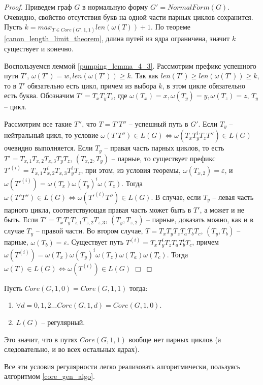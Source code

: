 \begin{proof}
    Приведем граф $G$ в нормальную форму $G' = NormalForm(G)$. 
    Очевидно, свойство отсутствия букв на одной части парных циклов сохранится.
    Пусть $k = max_{T \in Core(G',1,1)} len(\omega(T)) + 1$. 
    По теореме \ref{canon_length_limit_theorem}, длина путей из ядра ограничена, значит $k$ существует и конечно.

    Воспользуемся леммой \ref{pumping_lemma_4_3}.
    Рассмотрим префикс успешного пути $T'$, $\omega(T') = w, len(\omega(T')) \geq k$. 
    Так как $len(T') \geq len(\omega(T')) \geq k$, то в $T'$ обязательно есть цикл, 
    причем из выбора $k$, в этом цикле обязательно есть буква.
    Обозначим $T' = T_x T_y T_z$, где $\omega(T_x) = x, \omega(T_y) = y, \omega(T_z) = z$, $T_y$ -- цикл.
    
    Рассмотрим все такие $T''$, что $T = T' T''$ -- успешный путь в $G'$.
    Если $T_y$ -- нейтральный цикл, то условие $\omega(T' T'') \in L(G) \iff \omega(T_x T_y^i T_z T'') \in L(G)$ очевидно выполняется.
    Если $T_y$ -- правая часть парных циклов, то есть $T' = T_{x,1} T_{x,2} T_{x,3} T_y T_z$, $(T_{x,2}, T_y)$ -- парные,
    то существует префикс $T'^{(i)} = T_{x,1} T_{x,2}^i T_{x,3} T_y^i T_z$, при этом, из условия теоремы, $\omega(T_{x,2}) = \varepsilon$,
    и $\omega(T'^{(i)}) = \omega(T_x) \omega(T_y)^i \omega(T_z)$. Тогда $\omega(T' T'') \in L(G) \iff \omega(T'^{(i)} T'') \in L(G)$.
    В случае, если $T_y$ -- левая часть парного цикла, соответствующая правая часть может быть в $T'$, а может и не быть. 
    Если $T' = T_x T_y T_{z,1} T_{z,2} T_{z,3}$, $(T_y,T_{z,2})$ -- парные, доказать можно, как и в случае $T_y$ -- правой части.
    Во втором случае, $T = T_x T_y T_z T_a T_b T_c$, $(T_y,T_b)$ -- парные,
    $\omega(T_b) = \varepsilon$. Существует путь $T^{(i)} = T_x T_y^i T_z T_a T_b^i T_c$, 
    причем $\omega(T^{(i)}) = \omega(T_x) \omega(T_y)^i \omega(T_z) \omega(T_a) \omega(T_c)$. Тогда $\omega(T) \in L(G) \iff \omega(T^{(i)}) \in L(G)$ $\Box$

\end{proof}

\begin{corollary}
    \label{codition_only_neutral}
    Пусть $Core(G, 1, 0) = Core(G, 1, 1)$ тогда:
    \begin{enumerate}[label=\arabic*)]
        \item $\forall d = 0,1,2 \dots Core(G, 1, d) = Core(G, 1, 0)$.
        \item $L(G)$ -- регулярный.
    \end{enumerate}
\end{corollary}
Это значит, что в путях $Core(G, 1, 1)$ вообще нет парных циклов (а следовательно, и во всех остальных ядрах).


Все эти условия регулярности легко реализовать алгоритмически, пользуясь алгоритмом \ref{core_gen_algo}.

\clearpage